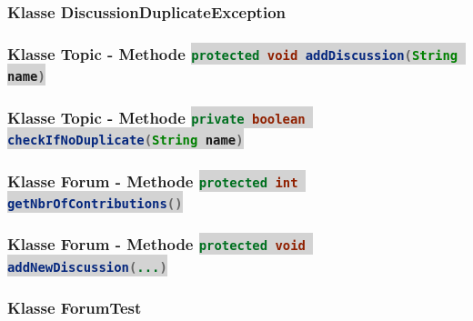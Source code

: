 \documentclass[11pt,ngerman]{article}
\newcommand{\inlinecode}[2]{\colorbox{lightgray}{\lstinline[language=#1]$#2$}}
\begin{document}
        \subsubsection{Klasse DiscussionDuplicateException}
        
        \vspace{.5cm}

        \subsubsection{Klasse Topic - Methode \inlinecode{Java}{protected void addDiscussion(String name)}}
        
        \vspace{.5cm}

        \subsubsection{Klasse Topic - Methode \inlinecode{Java}{private boolean checkIfNoDuplicate(String name)}}
        
        \vspace{.5cm}

        \subsubsection{Klasse Forum - Methode \inlinecode{Java}{protected int getNbrOfContributions()}}
        
        \vspace{.5cm}

        \subsubsection{Klasse Forum - Methode \inlinecode{Java}{protected void addNewDiscussion(...)}}
        
        \vspace{.5cm}

        \subsubsection{Klasse ForumTest}
        \label{sssec:ForumTest_Code}
        
\end{document}
